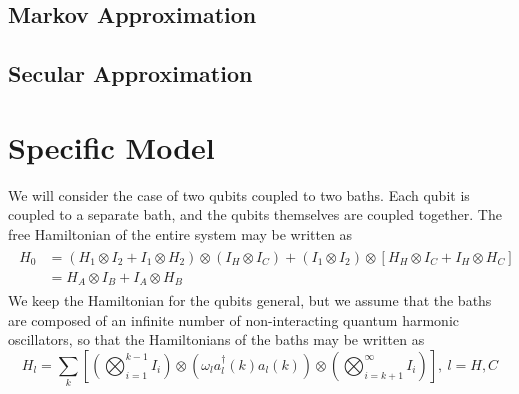 \documentclass{article}
\newcommand{\ten}{\otimes}
\begin{document}
\subsection{Markov Approximation}






\subsection{Secular Approximation}





\section{Specific Model}

We will consider the case of two qubits coupled to two baths. Each qubit is coupled to a separate bath, and the qubits themselves are coupled together. The free Hamiltonian of the entire system may be written as
\begin{align}\label{freeham}
\begin{split}
H_0 &= (H_1\ten I_2 + I_1\ten H_2)\ten(I_H\ten I_C) + (I_1\ten I_2)\ten\left[H_H\ten I_C + I_H\ten H_C\right]\\
&= H_A\ten I_B + I_A\ten H_B
\end{split}
\end{align}
We keep the Hamiltonian for the qubits general, but we assume that the baths are composed of an infinite number of non-interacting quantum harmonic oscillators, so that the Hamiltonians of the baths may be written as
\begin{equation}
H_l = \sum_k\left[\left(\bigotimes_{i=1}^{k-1}I_i\right)\ten\left(\omega_l a_l^{\dag}(k)a_l(k)\right)\ten\left(\bigotimes_{i=k+1}^{\infty}I_i\right)\right],\ l = H,C
\end{equation}
\end{document}
